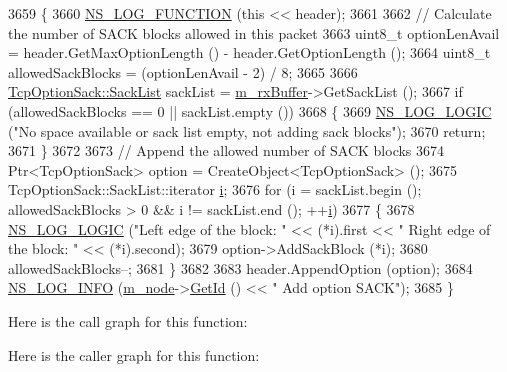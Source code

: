 \begin{DoxyCode}
3659 \{
3660   \hyperlink{log-macros-disabled_8h_a90b90d5bad1f39cb1b64923ea94c0761}{NS\_LOG\_FUNCTION} (\textcolor{keyword}{this} << header);
3661 
3662   \textcolor{comment}{// Calculate the number of SACK blocks allowed in this packet}
3663   uint8\_t optionLenAvail = header.GetMaxOptionLength () - header.GetOptionLength ();
3664   uint8\_t allowedSackBlocks = (optionLenAvail - 2) / 8;
3665 
3666   \hyperlink{classns3_1_1TcpOptionSack_a2aa2d721c71424680d79ebaa079f264a}{TcpOptionSack::SackList} sackList = \hyperlink{classns3_1_1TcpSocketBase_a0163894148e5a70e6bd89970a1483fae}{m\_rxBuffer}->GetSackList ();
3667   \textcolor{keywordflow}{if} (allowedSackBlocks == 0 || sackList.empty ())
3668     \{
3669       \hyperlink{group__logging_ga88acd260151caf2db9c0fc84997f45ce}{NS\_LOG\_LOGIC} (\textcolor{stringliteral}{"No space available or sack list empty, not adding sack blocks"});
3670       \textcolor{keywordflow}{return};
3671     \}
3672 
3673   \textcolor{comment}{// Append the allowed number of SACK blocks}
3674   Ptr<TcpOptionSack> option = CreateObject<TcpOptionSack> ();
3675   TcpOptionSack::SackList::iterator \hyperlink{bernuolliDistribution_8m_a6f6ccfcf58b31cb6412107d9d5281426}{i};
3676   \textcolor{keywordflow}{for} (i = sackList.begin (); allowedSackBlocks > 0 && i != sackList.end (); ++\hyperlink{bernuolliDistribution_8m_a6f6ccfcf58b31cb6412107d9d5281426}{i})
3677     \{
3678       \hyperlink{group__logging_ga88acd260151caf2db9c0fc84997f45ce}{NS\_LOG\_LOGIC} (\textcolor{stringliteral}{"Left edge of the block: "} << (*i).first << \textcolor{stringliteral}{" Right edge of the block: "} <<
       (*i).second);
3679       option->AddSackBlock (*i);
3680       allowedSackBlocks--;
3681     \}
3682 
3683   header.AppendOption (option);
3684   \hyperlink{group__logging_gafbd73ee2cf9f26b319f49086d8e860fb}{NS\_LOG\_INFO} (\hyperlink{classns3_1_1TcpSocketBase_abefd2b9f439fe5d0deef93ee68884a1e}{m\_node}->\hyperlink{classns3_1_1Node_aaf49b64a843565ce3812326313b370ac}{GetId} () << \textcolor{stringliteral}{" Add option SACK"});
3685 \}
\end{DoxyCode}


Here is the call graph for this function\+:




Here is the caller graph for this function\+:


